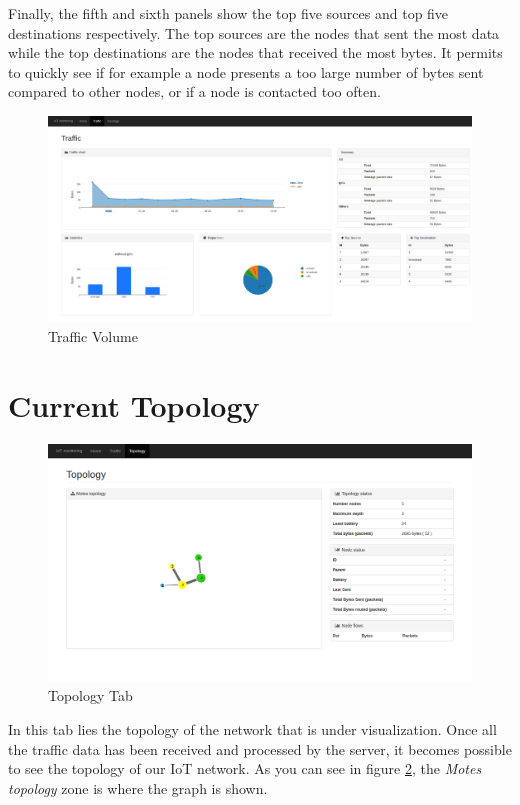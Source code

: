 Finally, the fifth and sixth panels show the top five sources and top five destinations respectively. The top sources are the nodes that sent the most data while the top destinations are the nodes that received the most bytes. It permits to quickly see if for example a node presents a too large number of bytes sent compared to other nodes, or if a node is contacted too often.

\begin{figure}
	\centering
	\includegraphics[width=\textwidth]{res/traffic.png}
	\caption{Traffic Volume}
	\label{fig:tool_traffic}
\end{figure}

\section{Current Topology}

\begin{figure}[!h]
	\centering
	\includegraphics[width=1.1\textwidth]{res/topology_interface.png}
	\caption{Topology Tab}
	\label{fig:topo}
\end{figure}

In this tab lies the topology of the network that is under visualization. Once all the traffic data has been received and processed by the server, it becomes possible to see the topology of our IoT network. As you can see in figure \ref{fig:topo}, the \textit{Motes topology} zone is where the graph is shown. \\

